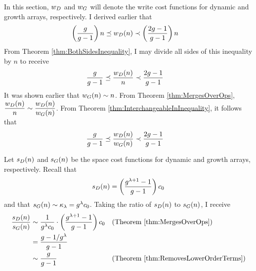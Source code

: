\HdrTimeComplexCmp

In this section, $w_D$ and $w_G$ will denote the write cost functions for dynamic and growth arrays, respectively. I derived earlier that
\begin{align*}
\left( \frac{g}{g - 1} \right) n \preceq w_D(n) &\prec \left( \frac{2g - 1}{g - 1} \right) n
\end{align*}
From Theorem \ref{thm:BothSidesInequality}, I may divide all sides of this inequality by $n$ to receive
\begin{align*}
\frac{g}{g - 1} \preceq \frac {w_D(n)} n &\prec \frac{2g - 1}{g - 1}
\end{align*}
It was shown earlier that $w_G(n) \sim n$. From Theorem \ref{thm:MergesOverOps}, $\dfrac {w_D(n)} n \sim \dfrac{w_D(n)}{w_G(n)}$. From Theorem \ref{thm:InterchangeableInInequality}, it follows that
\begin{align*}
\frac{g}{g - 1} \preceq \frac {w_D(n)} {w_G(n)} &\prec \frac{2g - 1}{g - 1}
\end{align*}
\HdrSpaceComplexCmp

Let $s_D(n)$ and $s_G(n)$ be the space cost functions for dynamic and growth arrays, respectively. Recall that
\begin{align*}
s_D(n) = \left( \frac{g^{\lambda + 1} - 1}{g - 1} \right) c_0
\end{align*}
and that $s_G(n) \sim \kappa_\lambda = g^\lambda c_0$. Taking the ratio of $s_D(n)$ to $s_G(n)$, I receive
\begin{align*}
\frac{s_D(n)}{s_G(n)} &\sim \frac{1}{g^\lambda c_0} \cdot \left( \frac{g^{\lambda + 1} - 1}{g - 1} \right) c_0 &&\text{(Theorem \ref{thm:MergesOverOps})}\\
&= \frac{g - 1 / {g^\lambda}}{g - 1}\\
&\sim \frac{g}{g - 1} &&\text{(Theorem \ref{thm:RemovesLowerOrderTerms})}
\end{align*}